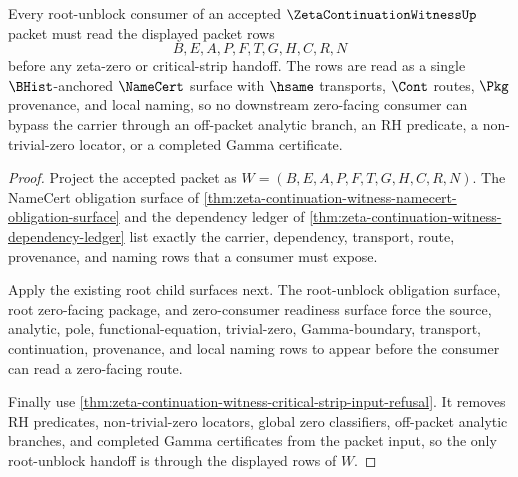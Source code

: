 \begin{theorem}
\label{thm:zeta-continuation-witness-root-readiness-lock}
Every root-unblock consumer of an accepted $\ZetaContinuationWitnessUp$ packet must read the displayed packet rows
$$
B,E,A,P,F,T,G,H,C,R,N
$$
before any zeta-zero or critical-strip handoff. The rows are read as a single $\BHist$-anchored $\NameCert$ surface with $\hsame$ transports, $\Cont$ routes, $\Pkg$ provenance, and local naming, so no downstream zero-facing consumer can bypass the carrier through an off-packet analytic branch, an RH predicate, a non-trivial-zero locator, or a completed Gamma certificate.
\end{theorem}
\begin{proof}
Project the accepted packet as $W=(B,E,A,P,F,T,G,H,C,R,N)$. The NameCert obligation surface of \autoref{thm:zeta-continuation-witness-namecert-obligation-surface} and the dependency ledger of \autoref{thm:zeta-continuation-witness-dependency-ledger} list exactly the carrier, dependency, transport, route, provenance, and naming rows that a consumer must expose.

Apply the existing root child surfaces next. The root-unblock obligation surface, root zero-facing package, and zero-consumer readiness surface force the source, analytic, pole, functional-equation, trivial-zero, Gamma-boundary, transport, continuation, provenance, and local naming rows to appear before the consumer can read a zero-facing route.

Finally use \autoref{thm:zeta-continuation-witness-critical-strip-input-refusal}. It removes RH predicates, non-trivial-zero locators, global zero classifiers, off-packet analytic branches, and completed Gamma certificates from the packet input, so the only root-unblock handoff is through the displayed rows of $W$.
\end{proof}

